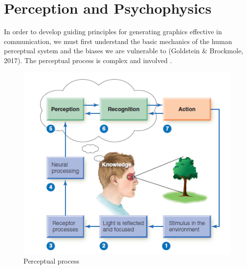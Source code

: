 \documentclass[print]{nuthesis}
\begin{document}
\hypertarget{perception-and-psychophysics}{%
\section{Perception and Psychophysics}\label{perception-and-psychophysics}}

In order to develop guiding principles for generating graphics effective in communication, we must first understand the basic mechanics of the human perceptual system and the biases we are vulnerable to (Goldstein \& Brockmole, 2017).
The perceptual process is complex and involved .

\begin{figure}[tbp]

{\centering \includegraphics[width=0.75\linewidth,]{images/perceptual-process-goldsein-pg5} 

}

\caption{Perceptual process}\label{fig:perceptual-process}
\end{figure}
\end{document}
